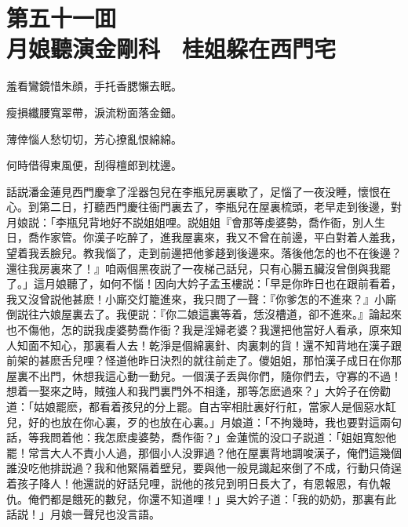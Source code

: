 
\chapter*{第五十一囬　\\月娘聽演金剛科　桂姐躱在西門宅}


\begin{myquote}
羞看鸞鏡惜朱顔，手托香腮懶去眠。

瘦損纖腰寬翠帶，淚流粉面落金鈿。

薄倖惱人愁切切，芳心撩亂恨綿綿。

何時借得東風便，刮得檀郎到枕邊。
\end{myquote}

話説潘金蓮見西門慶拿了淫器包兒在李瓶兒房裏歇了，足惱了一夜没睡，懷恨在心。到第二日，打聽西門慶往衙門裏去了，李瓶兒在屋裏梳頭，老早走到後邊，對月娘説：「李瓶兒背地好不説姐姐哩。説姐姐『會那等虔婆勢，喬作衙，別人生日，喬作家管。你漢子吃醉了，進我屋裏來，我又不曾在前邊，平白對着人羞我，望着我丢臉兒。教我惱了，走到前邊把他爹趍到後邊來。落後他怎的也不在後邊？還往我房裏來了！』咱兩個黑夜説了一夜梯己話兒，只有心腸五臟沒曾倒與我罷了。」這月娘聽了，如何不惱！因向大妗子孟玉樓説：「早是你昨日也在跟前看着，我又沒曾説他甚麽！小廝交灯籠進來，我只問了一聲：『你爹怎的不進來？』小廝倒説往六娘屋裏去了。我便説：『你二娘這裏等着，恁沒槽道，卻不進來。』論起來也不傷他，怎的説我虔婆勢喬作衙？我是淫婦老婆？我還把他當好人看承，原來知人知面不知心，那裏看人去！乾淨是個綿裏針、肉裏刺的貨！還不知背地在漢子跟前架的甚麽舌兒哩？怪道他昨日決烈的就往前走了。儍姐姐，那怕漢子成日在你那屋裏不出門，休想我這心動一動兒。一個漢子丢與你們，隨你們去，守寡的不過！想着一娶來之時，賊強人和我門裏門外不相逢，那等怎麽過來？」大妗子在傍勸道：「姑娘罷麽，都看着孩兒的分上罷。自古宰相肚裏好行舡，當家人是個惡水缸兒，好的也放在你心裏，歹的也放在心裏。」月娘道：「不拘幾時，我也要對這兩句話，等我問着他：我怎麽虔婆勢，喬作衙？」金蓮慌的没口子説道：「姐姐寬恕他罷！常言大人不責小人過，那個小人没罪過？他在屋裏背地調唆漢子，俺們這幾個誰没吃他排説過？我和他緊隔着壁兒，要與他一般見識起來倒了不成，行動只倚逞着孩子降人！他還説的好話兒哩，説他的孩兒到明日長大了，有恩報恩，有仇報仇。俺們都是餓死的數兒，你還不知道哩！」吳大妗子道：「我的奶奶，那裏有此話説！」月娘一聲兒也没言語。

